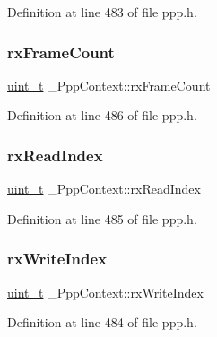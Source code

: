 Definition at line 483 of file ppp.\+h.

\mbox{\label{struct__PppContext_aa6ca6bde999b31d8fb2a7c34fa3b16cc}} 
\subsubsection{\texorpdfstring{rx\+Frame\+Count}{rxFrameCount}}
{\footnotesize\ttfamily \hyperlink{compiler__port_8h_a12a1e9b3ce141648783a82445d02b58d}{uint\+\_\+t} \+\_\+\+Ppp\+Context\+::rx\+Frame\+Count}



Definition at line 486 of file ppp.\+h.

\mbox{\label{struct__PppContext_af24ec29275eba5e42fd5ed2f07c802d3}} 
\subsubsection{\texorpdfstring{rx\+Read\+Index}{rxReadIndex}}
{\footnotesize\ttfamily \hyperlink{compiler__port_8h_a12a1e9b3ce141648783a82445d02b58d}{uint\+\_\+t} \+\_\+\+Ppp\+Context\+::rx\+Read\+Index}



Definition at line 485 of file ppp.\+h.

\mbox{\label{struct__PppContext_a479c7cad1ff067533c34164490205f07}} 
\subsubsection{\texorpdfstring{rx\+Write\+Index}{rxWriteIndex}}
{\footnotesize\ttfamily \hyperlink{compiler__port_8h_a12a1e9b3ce141648783a82445d02b58d}{uint\+\_\+t} \+\_\+\+Ppp\+Context\+::rx\+Write\+Index}



Definition at line 484 of file ppp.\+h.

